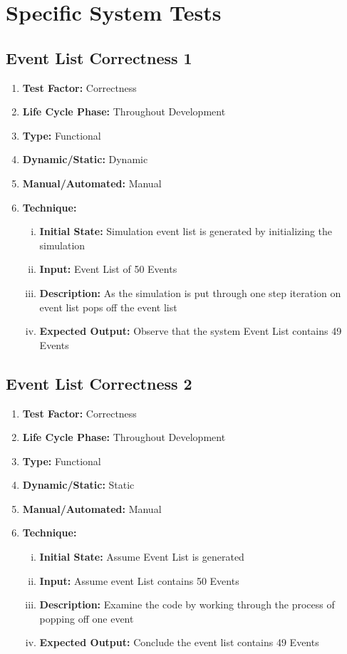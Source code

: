 \documentclass[paper=letter, fontsize=10pt]{scrartcl}
\numberwithin{equation}{section}		%
\numberwithin{figure}{section}			%
\numberwithin{table}{section}				%
\begin{document}
\section{Specific System Tests}
\subsection{Event List Correctness 1}
\begin{enumerate}[]
	\item \textbf{Test Factor:} Correctness
	\item \textbf{Life Cycle Phase:} Throughout Development
	\item \textbf{Type:} Functional
	\item \textbf{Dynamic/Static:} Dynamic
	\item \textbf{Manual/Automated:} Manual
	\item \textbf{Technique:} 
		\begin{enumerate}[(i)]
			\item \textbf{Initial State:} Simulation event list is generated by initializing the simulation			
			\item \textbf{Input:} Event List of 50 Events
			\item \textbf{Description:} As the simulation is put through one step iteration on event list pops off the event list
			\item \textbf{Expected Output:} Observe that the system Event List contains 49 Events
		\end{enumerate}
\end{enumerate}

\subsection{Event List Correctness 2}
\begin{enumerate}[]
	\item \textbf{Test Factor:} Correctness
	\item \textbf{Life Cycle Phase:} Throughout Development
	\item \textbf{Type:} Functional
	\item \textbf{Dynamic/Static:} Static
	\item \textbf{Manual/Automated:} Manual
	\item \textbf{Technique:} 
		\begin{enumerate}[(i)]
			\item \textbf{Initial State:} Assume Event List is generated			
			\item \textbf{Input:} Assume event List contains 50 Events
			\item \textbf{Description:} Examine the code by working through the process of popping off one event
			\item \textbf{Expected Output:} Conclude the event list contains 49 Events
		\end{enumerate}
\end{enumerate}
\end{document}
